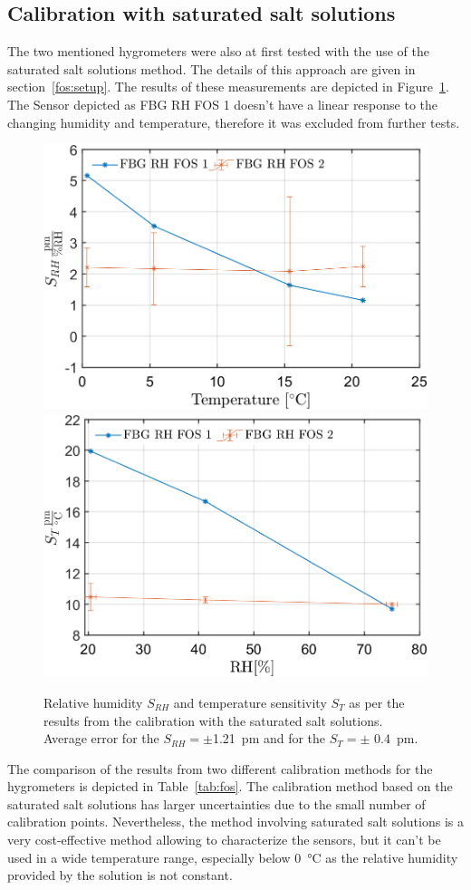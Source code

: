 \subsection{Calibration with saturated salt solutions}
The two mentioned hygrometers were also at first tested with the use of the saturated salt solutions method. The details of this approach are given in section~\ref{fos:setup}. The results of these measurements are depicted in Figure~\ref{fig:fos_salt}. The Sensor depicted as FBG RH FOS 1 doesn't have a linear response to the changing humidity and temperature, therefore it was excluded from further tests. 

\begin{figure}[!h]
\centering
\includegraphics[width=0.48\columnwidth]{Chapter5/images/salt_srh.png}
\includegraphics[width=0.49\columnwidth]{Chapter5/images/salt_st.png}
\caption{Relative humidity $S_{RH}$ and temperature sensitivity $S_{T}$ as per the results from the calibration with the saturated salt solutions. Average error for the $S_{RH} = \pm $\SI{1.21}{\pico\metre} and for the $S_{T}=\pm$ \SI{0.4}{\pico\metre}.}
\label{fig:fos_salt}
\end{figure}

The comparison of the results from two different calibration methods for the hygrometers is depicted in Table~\ref{tab:fos}. The calibration method based on the saturated salt solutions has larger uncertainties due to the small number of calibration points. Nevertheless, the method involving saturated salt solutions is a very cost-effective method allowing to characterize the sensors, but it can't be used in a wide temperature range, especially below \SI{0}{\celsius} as the relative humidity provided by the solution is not constant. 

